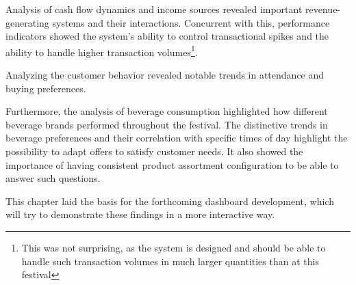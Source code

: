 Analysis of cash flow dynamics and income sources revealed important revenue-generating systems and their interactions.
Concurrent with this, performance indicators showed the system's ability to control transactional spikes and the ability to handle higher transaction
volumes\footnote{This was not surprising, as the system is designed and should be able to handle such transaction volumes in much larger quantities than at this festival}.

Analyzing the customer behavior revealed notable trends in attendance and buying preferences.

Furthermore, the analysis of beverage consumption highlighted how different beverage brands performed throughout the festival.
The distinctive trends in beverage preferences and their correlation with specific times of day highlight the possibility to adapt offers to satisfy customer needs.
It also showed the importance of having consistent product assortment configuration to be able to answer such questions.

This chapter laid the basis for the forthcoming dashboard development, which will try to demonstrate these findings in a more interactive way.

